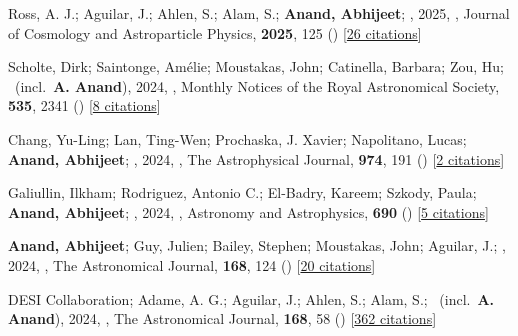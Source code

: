 \item[{\color{numcolor}\scriptsize12}] Ross, A. J.; Aguilar, J.; Ahlen, S.; Alam, S.; \textbf{Anand, Abhijeet}; \etal, 2025, , Journal of Cosmology and Astroparticle Physics, \textbf{2025}, 125 () [\href{https://ui.adsabs.harvard.edu/abs/2025JCAP...01..125R}{26 citations}]

\item[{\color{numcolor}\scriptsize11}] Scholte, Dirk; Saintonge, Am{\'e}lie; Moustakas, John; Catinella, Barbara; Zou, Hu; \etal\ (incl.\ \textbf{A. Anand}), 2024, , Monthly Notices of the Royal Astronomical Society, \textbf{535}, 2341 () [\href{https://ui.adsabs.harvard.edu/abs/2024MNRAS.535.2341S}{8 citations}]

\item[{\color{numcolor}\scriptsize10}] Chang, Yu-Ling; Lan, Ting-Wen; Prochaska, J. Xavier; Napolitano, Lucas; \textbf{Anand, Abhijeet}; \etal, 2024, , The Astrophysical Journal, \textbf{974}, 191 () [\href{https://ui.adsabs.harvard.edu/abs/2024ApJ...974..191C}{2 citations}]

\item[{\color{numcolor}\scriptsize9}] Galiullin, Ilkham; Rodriguez, Antonio C.; El-Badry, Kareem; Szkody, Paula; \textbf{Anand, Abhijeet}; \etal, 2024, , Astronomy and Astrophysics, \textbf{690} () [\href{https://ui.adsabs.harvard.edu/abs/2024A&A...690A.374G}{5 citations}]

\item[{\color{numcolor}\scriptsize8}] \textbf{Anand, Abhijeet}; Guy, Julien; Bailey, Stephen; Moustakas, John; Aguilar, J.; \etal, 2024, , The Astronomical Journal, \textbf{168}, 124 () [\href{https://ui.adsabs.harvard.edu/abs/2024AJ....168..124A}{20 citations}]

\item[{\color{numcolor}\scriptsize7}] DESI Collaboration; Adame, A. G.; Aguilar, J.; Ahlen, S.; Alam, S.; \etal\ (incl.\ \textbf{A. Anand}), 2024, , The Astronomical Journal, \textbf{168}, 58 () [\href{https://ui.adsabs.harvard.edu/abs/2024AJ....168...58D}{362 citations}]

